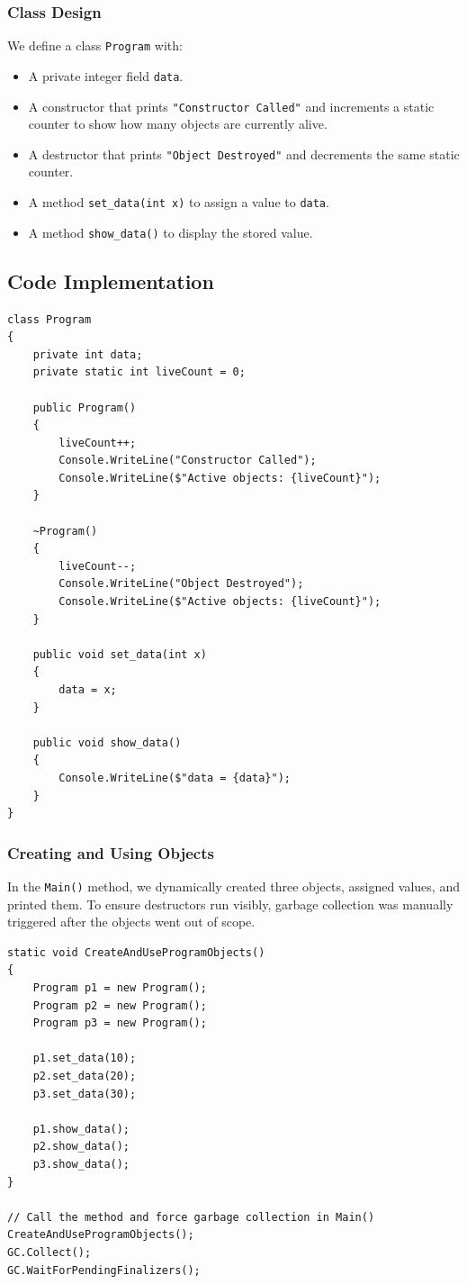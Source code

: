 \subsubsection{Class Design}
We define a class \texttt{Program} with:
\begin{itemize}
    \item A private integer field \texttt{data}.
    \item A constructor that prints \texttt{"Constructor Called"} and increments a static counter to show how many objects are currently alive.
    \item A destructor that prints \texttt{"Object Destroyed"} and decrements the same static counter.
    \item A method \texttt{set\_data(int x)} to assign a value to \texttt{data}.
    \item A method \texttt{show\_data()} to display the stored value.
\end{itemize}

\subsection*{Code Implementation}
\begin{lstlisting}
class Program
{
    private int data;
    private static int liveCount = 0;

    public Program()
    {
        liveCount++;
        Console.WriteLine("Constructor Called");
        Console.WriteLine($"Active objects: {liveCount}");
    }

    ~Program()
    {
        liveCount--;
        Console.WriteLine("Object Destroyed");
        Console.WriteLine($"Active objects: {liveCount}");
    }

    public void set_data(int x)
    {
        data = x;
    }

    public void show_data()
    {
        Console.WriteLine($"data = {data}");
    }
}
\end{lstlisting}

\subsubsection{Creating and Using Objects}
In the \texttt{Main()} method, we dynamically created three objects, assigned values, and printed them. 
To ensure destructors run visibly, garbage collection was manually triggered after the objects went out of scope.

\begin{lstlisting}
static void CreateAndUseProgramObjects()
{
    Program p1 = new Program();
    Program p2 = new Program();
    Program p3 = new Program();

    p1.set_data(10);
    p2.set_data(20);
    p3.set_data(30);

    p1.show_data();
    p2.show_data();
    p3.show_data();
}

// Call the method and force garbage collection in Main()
CreateAndUseProgramObjects();
GC.Collect();
GC.WaitForPendingFinalizers();
\end{lstlisting}

